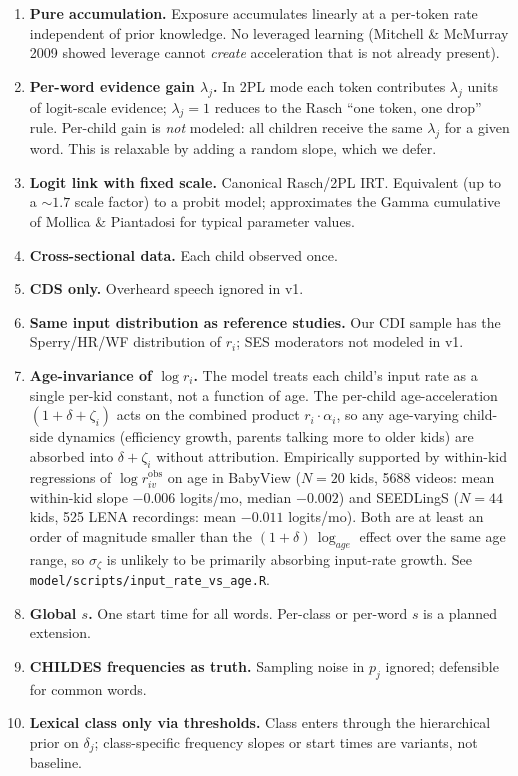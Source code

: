 \documentclass[11pt]{article}
\begin{document}
\begin{enumerate}[leftmargin=1.3em]
\item \textbf{Pure accumulation.} Exposure accumulates linearly at a
  per-token rate independent of prior knowledge. No leveraged learning
  (Mitchell \& McMurray 2009 showed leverage cannot \emph{create}
  acceleration that is not already present).
\item \textbf{Per-word evidence gain \(\lambda_j\).} In 2PL mode each
  token contributes \(\lambda_j\) units of logit-scale evidence;
  \(\lambda_j = 1\) reduces to the Rasch ``one token, one drop'' rule.
  Per-child gain is \emph{not} modeled: all children receive the same
  \(\lambda_j\) for a given word. This is relaxable by adding a random
  slope, which we defer.
\item \textbf{Logit link with fixed scale.} Canonical Rasch/2PL IRT.
  Equivalent (up to a \(\sim\!1.7\) scale factor) to a probit model;
  approximates the Gamma cumulative of Mollica \& Piantadosi for typical
  parameter values.
\item \textbf{Cross-sectional data.} Each child observed once.
\item \textbf{CDS only.} Overheard speech ignored in v1.
\item \textbf{Same input distribution as reference studies.} Our CDI
  sample has the Sperry/HR/WF distribution of $r_i$; SES moderators not
  modeled in v1.
\item \textbf{Age-invariance of \(\log r_i\).} The model treats each
  child's input rate as a single per-kid constant, not a function of
  age. The per-child age-acceleration \((1 + \delta + \zeta_i)\) acts
  on the combined product \(r_i \cdot \alpha_i\), so any age-varying
  child-side dynamics (efficiency growth, parents talking more to
  older kids) are absorbed into \(\delta + \zeta_i\) without
  attribution. Empirically supported by within-kid regressions of
  \(\log r_{iv}^{\mathrm{obs}}\) on age in BabyView (\(N=20\) kids,
  5688 videos: mean within-kid slope \(-0.006\) logits/mo,
  median \(-0.002\)) and SEEDLingS (\(N=44\) kids, 525 LENA
  recordings: mean \(-0.011\) logits/mo). Both are at least an order
  of magnitude smaller than the \((1+\delta)\,\log_{age}\) effect over
  the same age range, so \(\sigma_\zeta\) is unlikely to be primarily
  absorbing input-rate growth. See \texttt{model/scripts/input\_rate\_vs\_age.R}.
\item \textbf{Global $s$.} One start time for all words. Per-class or
  per-word $s$ is a planned extension.
\item \textbf{CHILDES frequencies as truth.} Sampling noise in $p_j$
  ignored; defensible for common words.
\item \textbf{Lexical class only via thresholds.} Class enters through
  the hierarchical prior on $\delta_j$; class-specific frequency slopes or
  start times are variants, not baseline.
\end{enumerate}
\end{document}
